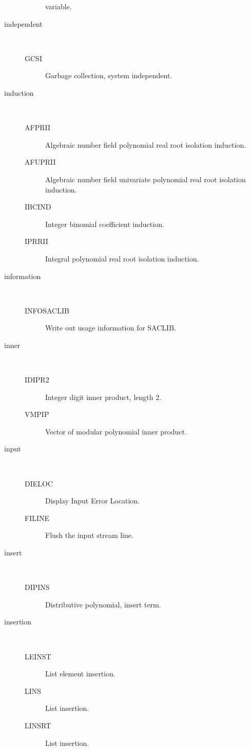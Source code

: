 \begin{description}
\begin{description}
    variable.
  \end{description}
\item[independent] \ \ 
  \begin{description}
  \item[GCSI]  Garbage collection, system independent.
  \end{description}
\item[induction] \ \ 
  \begin{description}
  \item[AFPRII]  Algebraic number field polynomial real root isolation
    induction.
  \item[AFUPRII]  Algebraic number field univariate polynomial real root
    isolation induction.
  \item[IBCIND]  Integer binomial coefficient induction.
  \item[IPRRII]  Integral polynomial real root isolation induction.
  \end{description}
\item[information] \ \ 
  \begin{description}
  \item[INFOSACLIB]  Write out usage information for SACLIB.
  \end{description}
\item[inner] \ \ 
  \begin{description}
  \item[IDIPR2]  Integer digit inner product, length 2.
  \item[VMPIP]  Vector of modular polynomial inner product.
  \end{description}
\item[input] \ \ 
  \begin{description}
  \item[DIELOC]  Display Input Error Location.
  \item[FILINE]  Flush the input stream line.
  \end{description}
\item[insert] \ \ 
  \begin{description}
  \item[DIPINS]  Distributive polynomial, insert term.
  \end{description}
\item[insertion] \ \ 
  \begin{description}
  \item[LEINST]  List element insertion.
  \item[LINS]  List insertion.
  \item[LINSRT]  List insertion.

\end{description}
\end{description}
